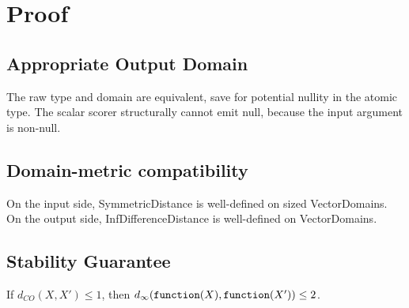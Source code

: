 \documentclass{article}
\begin{document}
\section{Proof}
\subsection{Appropriate Output Domain}
The raw type and domain are equivalent, save for potential nullity in the atomic type. 
The scalar scorer structurally cannot emit null, because the input argument is non-null.

\subsection{Domain-metric compatibility}
On the input side, SymmetricDistance is well-defined on sized VectorDomains. 
On the output side, InfDifferenceDistance is well-defined on VectorDomains.

\subsection{Stability Guarantee}


\begin{lemma}
    \label{single-change-stab}
    If $d_{CO}(X, X') \le 1$, then $d_\infty(\texttt{function}(X), \texttt{function}(X')) \le 2$.
\end{lemma}
\end{document}
